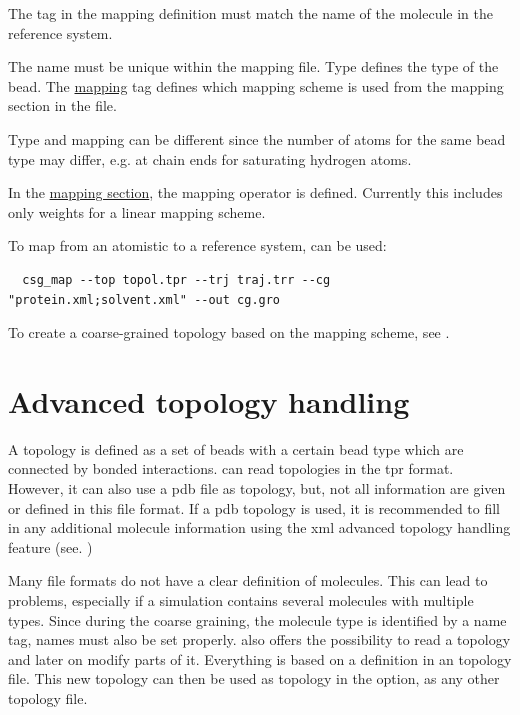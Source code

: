 

The  tag in the mapping definition must match the name of the molecule in the reference system.

The name must be unique within the mapping file. Type defines the type of the bead. The \hyperlink{\mapref{topology.cg_beads.cg_bead.mapping}}{mapping} tag defines which mapping scheme is used from the mapping section in the file.

Type and mapping can be different since the number of atoms for the same bead type may differ, e.g. at chain ends for saturating hydrogen atoms.

In the \hyperlink{\mapref{topology.cg_beads.cg_bead.mapping}}{mapping section}, the mapping operator is defined. Currently this includes only weights for a linear mapping scheme.

To map from an atomistic to a reference system,  can be used:
\begin{verbatim}
  csg_map --top topol.tpr --trj traj.trr --cg "protein.xml;solvent.xml" --out cg.gro
\end{verbatim}

To create a coarse-grained topology based on the mapping scheme, see .



\section{Advanced topology handling}
\label{sec:adv_topology}


A topology is defined as a set of beads with a certain bead type which are connected by bonded interactions.
\votca can read topologies in the \gromacs tpr format. However, it can also use a pdb file as topology, but, not all information are given or defined in this file format. If a pdb topology is used, it is recommended to fill in any additional molecule information using the xml advanced topology handling feature (see. )


Many file formats do not have a clear definition of molecules. This can lead to problems, especially if a simulation contains several molecules with multiple types. Since during the coarse graining, the molecule type is identified by a name tag, names must also be set properly. \votca also offers the possibility to read a topology and later on modify parts of it. Everything is based on a definition in an \xml topology file. This new \xml topology can then be used as topology in the  option, as any other topology file.

